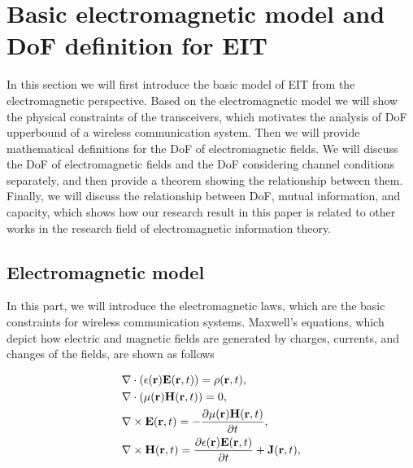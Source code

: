 \documentclass[12pt,draftclsnofoot,journal,onecolumn]{IEEEtran}
\begin{document}
{\color{red}\section{Basic electromagnetic model and DoF definition for EIT}

In this section we will first introduce the basic model of EIT from the electromagnetic perspective. Based on the electromagnetic model we will show the physical constraints of the transceivers, which motivates the analysis of DoF upperbound of a wireless communication system. Then we will provide mathematical definitions for the DoF of electromagnetic fields. We will discuss the DoF of electromagnetic fields and the DoF considering channel conditions separately, and then provide a theorem showing the relationship between them. Finally, we will discuss the relationship between DoF, mutual information, and capacity, which shows how our research result in this paper is related to other works in the research field of electromagnetic information theory.

\subsection{Electromagnetic model}

In this part, we will introduce the electromagnetic laws, which are the basic constraints for wireless communication systems. Maxwell's equations, which depict how electric and magnetic fields are generated by charges, currents, and changes of the fields, are shown as follows \cite{griffiths2005introduction}

\begin{subequations}
	\begin{align} 
		& \nabla \cdot  (\epsilon({\bf r}) {\bf E}({\bf r},t)) = \rho({\bf r},t), \label{eqn_1a}\\
		& \nabla \cdot (\mu({\bf r}) {\bf H}({\bf r},t)) = 0,\\
		&\nabla \times {\bf E}({\bf r},t) = -\frac{\partial \mu({\bf r}) {\bf H}({\bf r},t)}{\partial t}, \label{eqn_1c}\\
		& \nabla \times {\bf H}({\bf r},t) = \frac{ \partial \epsilon({\bf r}) {\bf E}({\bf r},t)}{\partial t}+{\bf J}({\bf r},t) \label{eqn_1d}, 
	\end{align}
\end{subequations}

}
\end{document}
